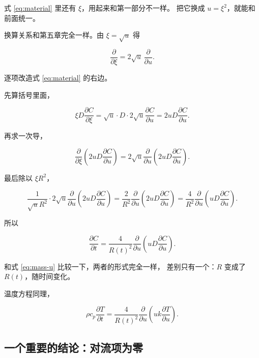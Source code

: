 式 \eqref{eq:material} 里还有 $\xi$，用起来和第一部分不一样。
把它换成 $u=\xi^2$，就能和前面统一。

换算关系和第五章完全一样。由 $\xi=\sqrt{u}$ 得

\begin{equation}
\frac{\partial}{\partial \xi} = 2\sqrt{u}\,\frac{\partial}{\partial u}.
\end{equation}

逐项改造式 \eqref{eq:material} 的右边。

先算括号里面，

\begin{equation}
\xi D\frac{\partial C}{\partial \xi}
= \sqrt{u}\cdot D\cdot 2\sqrt{u}\frac{\partial C}{\partial u}
= 2uD\frac{\partial C}{\partial u}.
\end{equation}

再求一次导，

\begin{equation}
\frac{\partial}{\partial \xi}\left(2uD\frac{\partial C}{\partial u}\right)
= 2\sqrt{u}\frac{\partial}{\partial u}\left(2uD\frac{\partial C}{\partial u}\right).
\end{equation}

最后除以 $\xi R^2$，

\begin{equation}
\frac{1}{\sqrt{u}R^2}\cdot 2\sqrt{u}\frac{\partial}{\partial u}\left(2uD\frac{\partial C}{\partial u}\right)
= \frac{2}{R^2}\frac{\partial}{\partial u}\left(2uD\frac{\partial C}{\partial u}\right)
= \frac{4}{R^2}\frac{\partial}{\partial u}\left(uD\frac{\partial C}{\partial u}\right).
\end{equation}

所以

\begin{equation}
\boxed{\;
\frac{\partial C}{\partial t} = \frac{4}{R(t)^2}\frac{\partial}{\partial u}\left(uD\frac{\partial C}{\partial u}\right).
\;}
\label{eq:material-u}
\end{equation}

和式 \eqref{eq:mass-u} 比较一下，两者的形式完全一样，
差别只有一个：$R$ 变成了 $R(t)$，随时间变化。

温度方程同理，

\begin{equation}
\rho c_p\frac{\partial T}{\partial t} = \frac{4}{R(t)^2}\frac{\partial}{\partial u}\left(uk\frac{\partial T}{\partial u}\right).
\end{equation}

\subsection{一个重要的结论：对流项为零}

